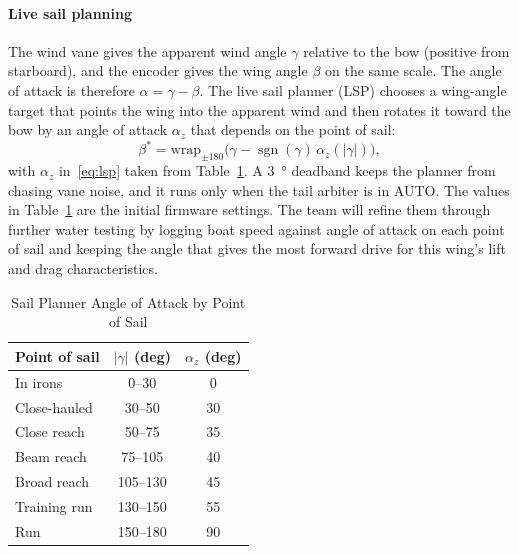 \paragraph*{Live sail planning}
The wind vane gives the apparent wind angle $\gamma$ relative to the bow
(positive from starboard), and the encoder gives the wing angle $\beta$ on the
same scale. The angle of attack is therefore $\alpha = \gamma - \beta$. The
live sail planner (LSP) chooses a wing-angle target that points the wing into
the apparent wind and then rotates it toward the bow by an angle of attack
$\alpha_z$ that depends on the point of sail:
\begin{equation}
\beta^{*} = \mathrm{wrap}_{\pm 180}\bigl(\gamma - \operatorname{sgn}(\gamma)\,\alpha_z(|\gamma|)\bigr),
\label{eq:lsp}
\end{equation}
with $\alpha_z$ in~\eqref{eq:lsp} taken from Table~\ref{tab:lsp}. A \SI{3}{\degree} deadband keeps
the planner from chasing vane noise, and it runs only when the tail arbiter is
in AUTO. The values in Table~\ref{tab:lsp} are the initial firmware settings. The
team will refine them through further water testing by logging boat speed
against angle of attack on each point of sail and keeping the angle that
gives the most forward drive for this wing's lift and drag characteristics.

\begin{table}[!t]
\caption{Sail Planner Angle of Attack by Point of Sail}
\label{tab:lsp}
\centering
\begin{tabular}{@{}lcc@{}}
\toprule
Point of sail & $|\gamma|$ (deg) & $\alpha_z$ (deg) \\
\midrule
In irons      & 0--30    & 0 \\
Close-hauled  & 30--50   & 30 \\
Close reach   & 50--75   & 35 \\
Beam reach    & 75--105  & 40 \\
Broad reach   & 105--130 & 45 \\
Training run  & 130--150 & 55 \\
Run           & 150--180 & 90 \\
\bottomrule
\end{tabular}
\end{table}

